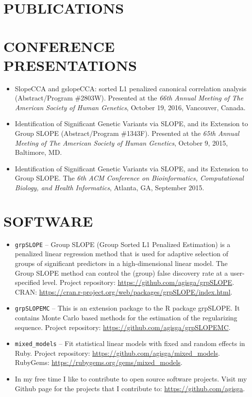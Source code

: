 \documentclass[margin]{res} %
\begin{document}
\begin{resume}
\section{PUBLICATIONS}


\nocite{*}

\section{CONFERENCE PRESENTATIONS}

\begin{itemize} \itemsep -2pt %
    \item SlopeCCA and gslopeCCA: sorted L1 penalized canonical correlation analysis (Abstract/Program \#2803W). Presented at the {\it 66th Annual Meeting of The American Society of Human Genetics}, October 19, 2016, Vancouver, Canada.
    \item Identification of Significant Genetic Variants via SLOPE, and its Extension to Group SLOPE (Abstract/Program \#1343F). Presented at the {\it 65th Annual Meeting of The American Society of Human Genetics}, October 9, 2015, Baltimore, MD.
  \item Identification of Significant Genetic Variants via SLOPE, and its Extension to Group SLOPE. The {\it 6th ACM Conference on Bioinformatics, Computational Biology, and Health Informatics}, Atlanta, GA, September 2015.
\end{itemize}

\section{SOFTWARE}

\begin{itemize} \itemsep -2pt %
    \item \verb!grpSLOPE! -- Group SLOPE (Group Sorted L1 Penalized Estimation) is a penalized linear regression method that is used for adaptive selection of groups of significant predictors in a high-dimensional linear model. The Group SLOPE method can control the (group) false discovery rate at a user-specified level. Project repository: \url{https://github.com/agisga/grpSLOPE}. CRAN: \url{https://cran.r-project.org/web/packages/grpSLOPE/index.html}.
    \item \verb!grpSLOPEMC! -- This is an extension package to the R package grpSLOPE. It contains Monte Carlo based methods for the estimation of the regularizing sequence. Project repository: \url{https://github.com/agisga/grpSLOPEMC}.
    \item \verb!mixed_models! -- Fit statistical linear models with fixed and random effects in Ruby. Project repository: \url{https://github.com/agisga/mixed_models}. RubyGems: \url{https://rubygems.org/gems/mixed_models}.
    \item In my free time I like to contribute to open source software projects. Visit my Github page for the projects that I contribute to: \url{https://github.com/agisga}.
\end{itemize}



\end{resume}
\end{document}
